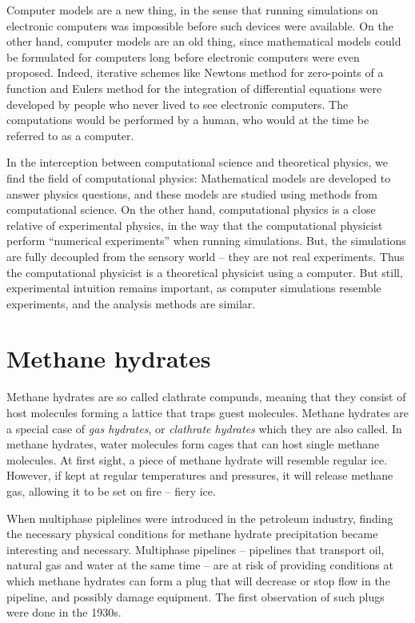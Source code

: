 Computer models are a new thing, in the sense that running simulations on electronic computers was impossible before such devices were available. On the other hand, computer models are an old thing, since mathematical models could be formulated for computers long before electronic computers were even proposed. Indeed, iterative schemes like Newtons method for zero-points of a function and Eulers method for the integration of differential equations were developed by people who never lived to see electronic computers. The computations would be performed by a human, who would at the time be referred to as a computer. 

In the interception between computational science and theoretical physics, we find the field of computational physics: Mathematical models are developed to answer physics questions, and these models are studied using methods from computational science. On the other hand, computational physics is a close relative of experimental physics, in the way that the computational physicist perform ``numerical experiments'' when running simulations. But, the simulations are fully decoupled from the sensory world -- they are not real experiments. Thus the computational physicist is a theoretical physicist using a computer. But still, experimental intuition remains important, as computer simulations resemble experiments, and the analysis methods are similar.

\section{Methane hydrates}
Methane hydrates are so called clathrate compunds, meaning that they consist of host molecules forming a lattice that traps guest molecules. Methane hydrates are a special case of \emph{gas hydrates}, or \emph{clathrate hydrates} which they are also called. In methane hydrates, water molecules form cages that can host single methane molecules. At first sight, a piece of methane hydrate will resemble regular ice. However, if kept at regular temperatures and pressures, it will release methane gas, allowing it to be set on fire -- fiery ice. 

When multiphase piplelines were introduced in the petroleum industry, finding the necessary physical conditions for methane hydrate precipitation became interesting and necessary. Multiphase pipelines -- pipelines that transport oil, natural gas and water at the same time -- are at risk of providing conditions at which methane hydrates can form a plug that will decrease or stop flow in the pipeline, and possibly damage equipment. The first observation of such plugs were done in the 1930s.

